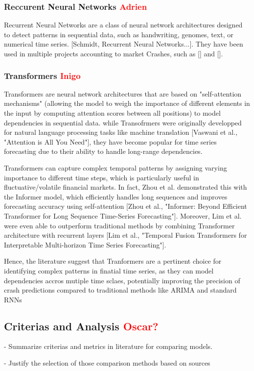 \documentclass[12pt, letterpaper]{article}
\begin{document}
    \subsubsection*{Reccurent Neural Networks \textcolor{red}{Adrien}}
    Recurrent Neural Networks are a class of neural network architectures designed to detect patterns in sequential data, such as handwriting, genomes, text, or numerical time series. [Schmidt, Recurrent Neural Networks...]. They have been used in multiple projects accounting to market Crashes, such as [] and [].

    \subsubsection*{Transformers \textcolor{red}{Inigo}}
Transformers are neural network architectures that are based on "self-attention mechanisms" (allowing the model to weigh the importance of different elements in the input by computing attention scores between all positions) to model dependencies in sequential data. while Transofrmers were originally developped for natural language processing tasks like machine translation [Vaswani et al., "Attention is All You Need"], they have become popular for time series forecasting due to their ability to handle long-range dependencies.

Transformers can capture complex temporal patterns by assigning varying importance to different time steps, which is particularly useful in fluctuative/volatile financial markets. In fact, Zhou et al. demonstrated this with the Informer model, which efficiently handles long sequences and improves forecasting accuracy using self-attention [Zhou et al., "Informer: Beyond Efficient Transformer for Long Sequence Time-Series Forecasting"]. Moreover, Lim et al. were even able to outperform traditional methods by combining Transformer architecture with recurrent layers [Lim et al., "Temporal Fusion Transformers for Interpretable Multi-horizon Time Series Forecasting"].

Hence, the literature suggest that Tranformers are a pertinent choice for identifying complex patterns in finatial time series, as they can model dependencies accros mutiple time sclaes, potentially improving the precision of crash predictions compared to traditional methods like ARIMA and standard RNNs



\subsection*{Criterias and Analysis \textcolor{red}{Oscar?}}
- Summarize criterias and metrics in literature for comparing models.

- Justify the selection of those comparison methods based on sources


\end{document}
